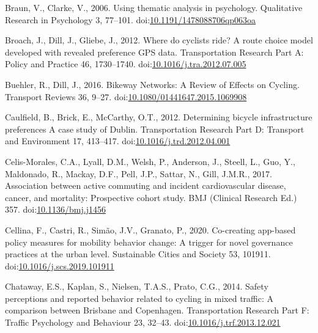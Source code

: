 \documentclass[]{elsarticle} %
\begin{document}
\leavevmode\hypertarget{ref-braunUsingThematicAnalysis2006}{}%
Braun, V., Clarke, V., 2006. Using thematic analysis in psychology.
Qualitative Research in Psychology 3, 77--101.
doi:\href{https://doi.org/10.1191/1478088706qp063oa}{10.1191/1478088706qp063oa}

\leavevmode\hypertarget{ref-broachWhereCyclistsRide2012}{}%
Broach, J., Dill, J., Gliebe, J., 2012. Where do cyclists ride? A route
choice model developed with revealed preference GPS data. Transportation
Research Part A: Policy and Practice 46, 1730--1740.
doi:\href{https://doi.org/10.1016/j.tra.2012.07.005}{10.1016/j.tra.2012.07.005}

\leavevmode\hypertarget{ref-buehlerBikewayNetworksReview2016b}{}%
Buehler, R., Dill, J., 2016. Bikeway Networks: A Review of Effects on
Cycling. Transport Reviews 36, 9--27.
doi:\href{https://doi.org/10.1080/01441647.2015.1069908}{10.1080/01441647.2015.1069908}

\leavevmode\hypertarget{ref-caulfieldDeterminingBicycleInfrastructure2012}{}%
Caulfield, B., Brick, E., McCarthy, O.T., 2012. Determining bicycle
infrastructure preferences A case study of Dublin. Transportation
Research Part D: Transport and Environment 17, 413--417.
doi:\href{https://doi.org/10.1016/j.trd.2012.04.001}{10.1016/j.trd.2012.04.001}

\leavevmode\hypertarget{ref-celis-moralesAssociationActiveCommuting2017b}{}%
Celis-Morales, C.A., Lyall, D.M., Welsh, P., Anderson, J., Steell, L.,
Guo, Y., Maldonado, R., Mackay, D.F., Pell, J.P., Sattar, N., Gill,
J.M.R., 2017. Association between active commuting and incident
cardiovascular disease, cancer, and mortality: Prospective cohort study.
BMJ (Clinical Research Ed.) 357.
doi:\href{https://doi.org/10.1136/bmj.j1456}{10.1136/bmj.j1456}

\leavevmode\hypertarget{ref-cellinaCocreatingAppbasedPolicy2020}{}%
Cellina, F., Castri, R., Simão, J.V., Granato, P., 2020. Co-creating
app-based policy measures for mobility behavior change: A trigger for
novel governance practices at the urban level. Sustainable Cities and
Society 53, 101911.
doi:\href{https://doi.org/10.1016/j.scs.2019.101911}{10.1016/j.scs.2019.101911}

\leavevmode\hypertarget{ref-chatawaySafetyPerceptionsReported2014}{}%
Chataway, E.S., Kaplan, S., Nielsen, T.A.S., Prato, C.G., 2014. Safety
perceptions and reported behavior related to cycling in mixed traffic: A
comparison between Brisbane and Copenhagen. Transportation Research Part
F: Traffic Psychology and Behaviour 23, 32--43.
doi:\href{https://doi.org/10.1016/j.trf.2013.12.021}{10.1016/j.trf.2013.12.021}
\end{document}
